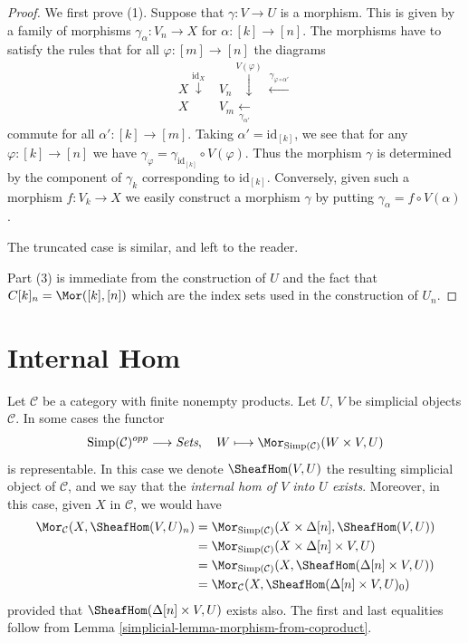 \begin{proof}
We first prove (1).
Suppose that $\gamma : V \to U$ is a morphism.
This is given by a family of morphisms
$\gamma_{\alpha} : V_n \to X$ for $\alpha : [k] \to [n]$.
The morphisms have to satisfy the
rules that for all $\varphi : [m] \to [n]$ the diagrams
$$
\begin{array}{cc}X \overset{\text{id}_X}{\downarrow} & V_n \overset{V(\varphi)}{\downarrow}\overset{\gamma_{\varphi \circ \alpha'}}{\longleftarrow} \\ X & V_m \underset{\gamma_{\alpha'}}{\longleftarrow}\end{array}
$$
commute for all $\alpha' : [k] \to [m]$.
Taking $\alpha' = \text{id}_{[k]}$, we see that
for any $\varphi : [k] \to [n]$ we have $\gamma_\varphi =
\gamma_{\text{id}_{[k]}} \circ V(\varphi)$. Thus the morphism
$\gamma$ is determined by the component of $\gamma_k$
corresponding to $\text{id}_{[k]}$. Conversely,
given such a morphism $f : V_k \to X$ we easily
construct a morphism $\gamma$ by putting
$\gamma_\alpha = f \circ V(\alpha)$.

\medskip\noindent
The truncated case is similar, and left to the reader.

\medskip\noindent
Part (3) is immediate from the construction of $U$ and the
fact that $C[k]_n = \Mor([k], [n])$ which are the index sets
used in the construction of $U_n$.
\end{proof}

\section{Internal Hom}
\label{simplicial-section-internal-hom}
Let $\mathcal{C}$ be a category with finite nonempty
products. Let $U$, $V$ be simplicial objects $\mathcal{C}$.
In some cases the functor
$$
\text{Simp}(\mathcal{C})^{opp} \longrightarrow \textit{Sets}, \quad
W \longmapsto \Mor_{\text{Simp}(\mathcal{C})}(W \times V, U)
$$
is representable. In this case we denote $\SheafHom(V, U)$
the resulting simplicial object of $\mathcal{C}$, and we say
that the {\it internal hom of $V$ into $U$ exists}. Moreover,
in this case, given $X$ in $\mathcal{C}$, we would have
\begin{align*}
\Mor_\mathcal{C}(X, \SheafHom(V, U)_n)
& =
\Mor_{\text{Simp}(\mathcal{C})}(X \times \Delta[n], \SheafHom(V, U)) \\
& =
\Mor_{\text{Simp}(\mathcal{C})}(X \times \Delta[n]\times V, U) \\
& =
\Mor_{\text{Simp}(\mathcal{C})}(X, \SheafHom(\Delta[n] \times V, U)) \\
& =
\Mor_\mathcal{C}(X, \SheafHom(\Delta[n] \times V, U)_0)
\end{align*}
provided that $\SheafHom(\Delta[n] \times V, U)$
exists also. The first and last equalities follow from
Lemma \ref{simplicial-lemma-morphism-from-coproduct}.

